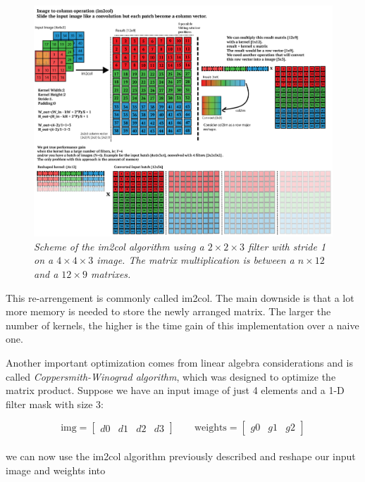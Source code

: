 \documentclass[12pt,a4paper]{report}
\begin{document}
\begin{figure}[h]
 \centering
 \includegraphics[scale=0.35]{./images/im2col.png}
 \caption{\it Scheme of the im2col algorithm using a $2 \times 2 \times 3$ filter with stride 1 on a $4 \times 4 \times 3$ image. The matrix multiplication is between a $n \times 12$ and a $12 \times 9$ matrixes.}
 \label{fig:im2col}
\end{figure}

This re-arrengement is commonly called im2col. The main downside is that a lot more memory is needed to store the newly arranged matrix.
The larger the number of kernels, the higher is the time gain of this implementation over a naive one.  

Another important optimization comes from linear algebra considerations and is called {\it Coppersmith-Winograd algorithm}, which was designed to optimize the matrix product.
Suppose we have an input image of just 4 elements and a 1-D filter mask with size 3:

\begin{equation}
\mbox{img} = \left[\begin{array}{cccc} d0 & d1 & d2 & d3 \end{array}\right] \quad\quad \mbox{weights} = \left[\begin{array}{ccc} g0 & g1 & g2 \end{array}\right]
\end{equation}
\\
we can now use the \textsf{im2col} algorithm previously described and reshape our input image and weights into
\end{document}
